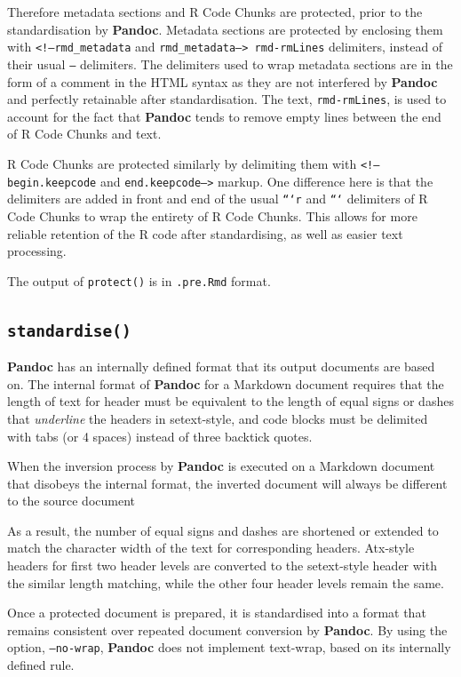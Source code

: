 \documentclass[a4paper, 12pt]{report}
\begin{document}
Therefore metadata sections and R Code Chunks are protected, prior to the standardisation by \textbf{Pandoc}. Metadata sections are protected by enclosing them with \texttt{<!--rmd\_metadata} and \texttt{rmd\_metadata--> rmd-rmLines} delimiters, instead of their usual \texttt{---} delimiters. The delimiters used to wrap metadata sections are in the form of a comment in the HTML syntax as they are not interfered by \textbf{Pandoc} and perfectly retainable after standardisation. The text, \texttt{rmd-rmLines}, is used to account for the fact that \textbf{Pandoc} tends to remove empty lines between the end of R Code Chunks and text.

R Code Chunks are protected similarly by delimiting them with \texttt{<!--begin.keepcode} and \texttt{end.keepcode-->} markup. One difference here is that the delimiters are added in front and end of the usual \texttt{```{r}} and \texttt{```} delimiters of R Code Chunks to wrap the entirety of R Code Chunks. This allows for more reliable retention of the R code after standardising, as well as easier text processing.

The output of \texttt{protect()} is in \texttt{.pre.Rmd} format.


\subsection{\texttt{standardise()}}
\textbf{Pandoc} has an internally defined format that its output documents are based on. The internal format of \textbf{Pandoc} for a Markdown document requires that the length of text for header must be equivalent to the length of equal signs or dashes that \emph{underline} the headers in setext-style, and code blocks must be delimited with tabs (or 4 spaces) instead of three backtick quotes.
 
When the inversion process by \textbf{Pandoc} is executed on a Markdown document that disobeys the internal format, the inverted document will always be different to the source document

As a result, the number of equal signs and dashes are shortened or extended to match the character width of the text for corresponding headers. Atx-style headers for first two header levels are converted to the setext-style header with the similar length matching, while the other four header levels remain the same. 

Once a protected document is prepared, it is standardised into a format that remains consistent over repeated document conversion by \textbf{Pandoc}. By using the option, \texttt{--no-wrap}, \textbf{Pandoc} does not implement text-wrap, based on its internally defined rule.
\end{document}
